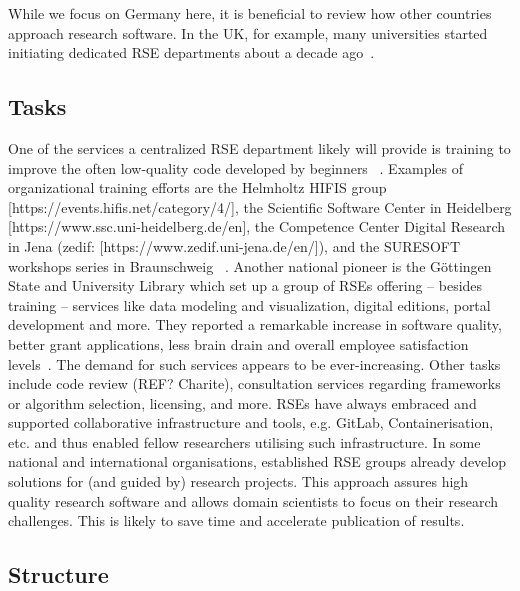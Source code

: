 \documentclass[a4paper]{article}
\begin{document}
While we focus on Germany here, it is beneficial to review how other countries approach research software.
In the UK, for example, many universities started initiating dedicated RSE departments about a decade ago~\autocite{Crouch2013}.

\subsection{Tasks}

One of the services a centralized RSE department likely will provide is training to improve the often low-quality code developed by beginners ~\autocite{Ostlund2023}.
Examples of organizational training efforts are the Helmholtz HIFIS group [https://events.hifis.net/category/4/], the Scientific Software Center in Heidelberg [https://www.ssc.uni-heidelberg.de/en], the Competence Center Digital Research in Jena (zedif: [https://www.zedif.uni-jena.de/en/]), and the SURESOFT workshops series in Braunschweig ~\autocite{SURESOFTLink, Blech2022}.
Another national pioneer is the Göttingen State and University Library which set up a group of RSEs offering – besides training – services like data modeling and visualization, digital editions, portal development and more. They reported a remarkable increase in software quality, better grant applications, less brain drain and overall employee satisfaction levels~\autocite{schimavoigt2023}.
The demand for such services appears to be ever-increasing.
Other tasks include code review (REF? Charite), consultation services regarding frameworks or algorithm selection, licensing, and more. 
RSEs have always embraced and supported collaborative infrastructure and tools, e.g. GitLab, Containerisation, etc. and thus enabled fellow researchers utilising such infrastructure. 
In some national and international organisations, established RSE groups already develop solutions for (and guided by) research projects. This approach assures high quality research software and allows domain scientists to focus on their research challenges. 
This is likely to save time and accelerate publication of results.



\subsection{Structure}
\end{document}
